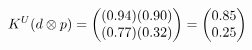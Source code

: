 \documentclass[preview]{standalone}
\begin{document}
\begin{align*}
\special{dvisvgm:raw <g id='unique000'>}K^U(d \otimes p) = \begin{pmatrix} (0.94)(0.90) \\ (0.77)(0.32) \end{pmatrix} = \begin{pmatrix} 0.85 \\ 0.25 \end{pmatrix}\special{dvisvgm:raw </g>}
\end{align*}
\end{document}
